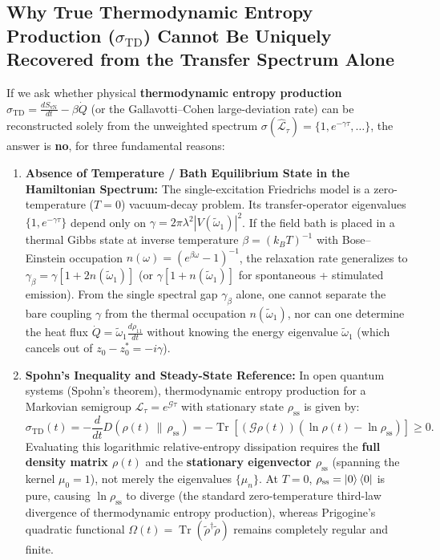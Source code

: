 \documentclass[11pt,a4paper]{article}
\begin{document}
\subsection{Why True Thermodynamic Entropy Production ($\sigma_{\mathrm{TD}}$) Cannot Be Uniquely Recovered from the Transfer Spectrum Alone}
If we ask whether physical \textbf{thermodynamic entropy production} $\sigma_{\mathrm{TD}} = \frac{dS_{\mathrm{vN}}}{dt} - \beta \dot{Q}$ (or the Gallavotti--Cohen large-deviation rate) can be reconstructed solely from the unweighted spectrum $\sigma(\widehat{\mathcal{L}}_\tau) = \{1, e^{-\gamma \tau}, \dots\}$, the answer is \textbf{no}, for three fundamental reasons:
\begin{enumerate}
    \item \textbf{Absence of Temperature / Bath Equilibrium State in the Hamiltonian Spectrum:}
    The single-excitation Friedrichs model is a zero-temperature ($T = 0$) vacuum-decay problem. Its transfer-operator eigenvalues $\{1, e^{-\gamma \tau}\}$ depend only on $\gamma = 2\pi\lambda^2|V(\tilde{\omega}_1)|^2$. If the field bath is placed in a thermal Gibbs state at inverse temperature $\beta = (k_B T)^{-1}$ with Bose--Einstein occupation $n(\omega) = (e^{\beta\omega} - 1)^{-1}$, the relaxation rate generalizes to $\gamma_\beta = \gamma [1 + 2n(\tilde{\omega}_1)]$ (or $\gamma[1 + n(\tilde{\omega}_1)]$ for spontaneous + stimulated emission). From the single spectral gap $\gamma_\beta$ alone, one cannot separate the bare coupling $\gamma$ from the thermal occupation $n(\tilde{\omega}_1)$, nor can one determine the heat flux $\dot{Q} = \tilde{\omega}_1 \frac{d\rho_{11}}{dt}$ without knowing the energy eigenvalue $\tilde{\omega}_1$ (which cancels out of $z_0 - z_0^* = -i\gamma$).

    \item \textbf{Spohn's Inequality and Steady-State Reference:}
    In open quantum systems (Spohn's theorem), thermodynamic entropy production for a Markovian semigroup $\mathcal{L}_\tau = e^{\mathcal{G}\tau}$ with stationary state $\rho_{\mathrm{ss}}$ is given by:
    \begin{equation}
    \sigma_{\mathrm{TD}}(t) = -\frac{d}{dt} D\left(\rho(t) \,\|\, \rho_{\mathrm{ss}}\right) = -\operatorname{Tr}\left[ (\mathcal{G}\rho(t)) (\ln \rho(t) - \ln \rho_{\mathrm{ss}}) \right] \ge 0.
    \end{equation}
    Evaluating this logarithmic relative-entropy dissipation requires the \textbf{full density matrix $\rho(t)$} and the \textbf{stationary eigenvector $\rho_{\mathrm{ss}}$} (spanning the kernel $\mu_0 = 1$), not merely the eigenvalues $\{\mu_n\}$. At $T = 0$, $\rho_{\mathrm{ss}} = \ket{0}\bra{0}$ is pure, causing $\ln \rho_{\mathrm{ss}}$ to diverge (the standard zero-temperature third-law divergence of thermodynamic entropy production), whereas Prigogine's quadratic functional $\Omega(t) = \operatorname{Tr}(\tilde{\rho}^\dagger \tilde{\rho})$ remains completely regular and finite.


\end{enumerate}
\end{document}
